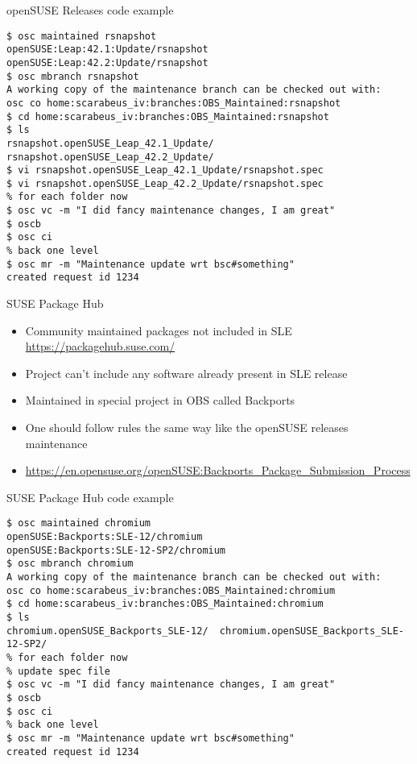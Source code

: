 \documentclass{beamer}
\begin{document}
\begin{frame}[fragile]{openSUSE Releases code example}
	\begin{tiny}
	\begin{verbatim}
$ osc maintained rsnapshot
openSUSE:Leap:42.1:Update/rsnapshot
openSUSE:Leap:42.2:Update/rsnapshot
$ osc mbranch rsnapshot
A working copy of the maintenance branch can be checked out with:
osc co home:scarabeus_iv:branches:OBS_Maintained:rsnapshot
$ cd home:scarabeus_iv:branches:OBS_Maintained:rsnapshot
$ ls
rsnapshot.openSUSE_Leap_42.1_Update/  rsnapshot.openSUSE_Leap_42.2_Update/
$ vi rsnapshot.openSUSE_Leap_42.1_Update/rsnapshot.spec
$ vi rsnapshot.openSUSE_Leap_42.2_Update/rsnapshot.spec
% for each folder now
$ osc vc -m "I did fancy maintenance changes, I am great"
$ oscb
$ osc ci
% back one level
$ osc mr -m "Maintenance update wrt bsc#something"
created request id 1234
	\end{verbatim}
	\end{tiny}
\end{frame}

\begin{frame}[t]{SUSE Package Hub}
	\begin{itemize}
	\item Community maintained packages not included in SLE \url{https://packagehub.suse.com/}
	\item Project can't include any software already present in SLE release
	\item Maintained in special project in OBS called Backports
	\item One should follow rules the same way like the openSUSE releases maintenance
	\item \url{https://en.opensuse.org/openSUSE:Backports_Package_Submission_Process}
	\end{itemize}
\end{frame}

\begin{frame}[fragile]{SUSE Package Hub code example}
	\begin{tiny}
	\begin{verbatim}
$ osc maintained chromium
openSUSE:Backports:SLE-12/chromium
openSUSE:Backports:SLE-12-SP2/chromium
$ osc mbranch chromium
A working copy of the maintenance branch can be checked out with:
osc co home:scarabeus_iv:branches:OBS_Maintained:chromium
$ cd home:scarabeus_iv:branches:OBS_Maintained:chromium
$ ls
chromium.openSUSE_Backports_SLE-12/  chromium.openSUSE_Backports_SLE-12-SP2/
% for each folder now
% update spec file
$ osc vc -m "I did fancy maintenance changes, I am great"
$ oscb
$ osc ci
% back one level
$ osc mr -m "Maintenance update wrt bsc#something"
created request id 1234
	\end{verbatim}
	\end{tiny}
\end{frame}
\end{document}
